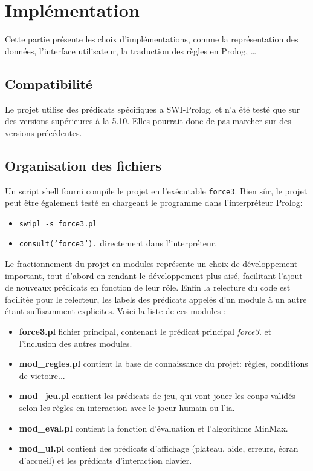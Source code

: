 \documentclass[a4paper,12pt]{article}
\begin{document}
\section{Implémentation}
Cette partie présente les choix d'implémentations, comme la représentation des données, l'interface utilisateur,
la traduction des règles en Prolog, \dots

\subsection{Compatibilité}
Le projet utilise des prédicats spécifiques a SWI-Prolog, et n'a été testé que sur des versions supérieures à la 5.10. Elles pourrait donc de pas marcher sur des versions précédentes.

\subsection{Organisation des fichiers}
  Un script shell fourni compile le projet
  en l'ex\'ecutable \texttt{force3}. Bien sûr, le projet peut être
  \'egalement test\'e en chargeant le programme dans l'interpr\'eteur Prolog:

  \begin{itemize}
    \item{\texttt{swipl -s force3.pl}}
    \item{\texttt{consult('force3').} directement dans l'interpr\'eteur.}
  \end{itemize}
  
  Le fractionnement du projet en modules repr\'esente un choix de
  d\'eveloppement important, tout d'abord en rendant le d\'eveloppement plus
  ais\'e, facilitant l'ajout de nouveaux pr\'edicats en fonction de leur rôle.
  Enfin la relecture du code est facilit\'ee pour le relecteur, les labels des
  pr\'edicats appel\'es d'un module \`a un autre \'etant suffisamment
  explicites. Voici la liste de ces modules :

  \begin{itemize}
    \item{\textbf{force3.pl} fichier principal, contenant le pr\'edicat
                  principal
                  \emph{force3.} et l'inclusion des autres modules.}
    \item{\textbf{mod\_regles.pl} contient la base de connaissance du
                  projet: r\`egles, conditions de victoire...}
    \item{\textbf{mod\_jeu.pl} contient les pr\'edicats de jeu, qui vont
                  jouer les coups valid\'es selon les r\`egles en
                  interaction avec le joeur humain ou l'ia.}
    \item{\textbf{mod\_eval.pl} contient la fonction
                  d'\'evaluation et l'algorithme MinMax.}
    \item{\textbf{mod\_ui.pl} contient des pr\'edicats d'affichage
                  (plateau, aide, erreurs, \'ecran d'accueil) et
                  les pr\'edicats d'interaction clavier.}
  \end{itemize}
\end{document}
